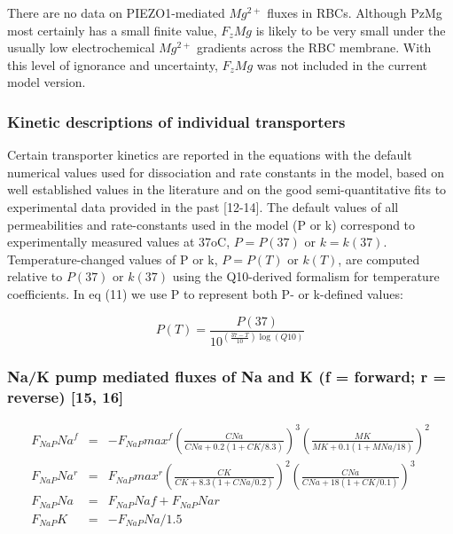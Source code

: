 \documentclass[a4paper]{article}
\newcommand{\med}[1]{M#1}
\newcommand{\cell}[1]{C#1}
\newcommand{\MNa}{\med{Na}}
\newcommand{\MK}{\med{K}}
\newcommand{\CNa}{\cell{Na}}
\newcommand{\CK}{\cell{K}}
\newcommand{\F}[2]{F_{#1}#2}
\begin{document}
There are no data on PIEZO1-mediated $Mg^{2+}$ fluxes in RBCs.  Although PzMg most certainly has a small finite value, $\F{z}{Mg}$ is likely to be very small under the usually low electrochemical $Mg^{2+}$ gradients across the RBC membrane.  With this level of ignorance and uncertainty, $\F{z}{Mg}$ was not included in the current model version.  

\subsubsection{Kinetic descriptions of individual transporters}
Certain transporter kinetics are reported in the equations with the default numerical values used for dissociation and rate constants in the model, based on well established values in the literature and on the good semi-quantitative fits to experimental data provided in the past [12-14].  The default values of all permeabilities and rate-constants used in the model (P or k) correspond to experimentally measured values at 37oC, $P = P(37)$ or $k = k(37)$.  Temperature-changed values of P or k, $P = P(T)$ or $k(T)$, are computed relative to $P(37)$ or $k(37)$ using the Q10-derived formalism for temperature coefficients. In eq (11) we use P to represent both P- or k-defined values:

\setcounter{equation}{10}
\renewcommand{\theequation}{\arabic{equation}}
\begin{equation}
P(T)  =  \frac{P(37)}{10^{\left(\frac{37-T}{10}\right)\log(Q10)}}
\end{equation}
\setcounter{equation}{0}
\renewcommand{\theequation}{11.\alph{equation}}


\subsubsection{Na/K pump mediated fluxes of Na and K (f = forward; r = reverse) [15, 16]}

\begin{eqnarray}
\F{NaP}{Na}^f  &=& -\F{NaP}{max}^f\left(\frac{\CNa}{\CNa + 0.2(1 + \CK/8.3)}\right)^3 \left(\frac{\MK}{\MK + 0.1(1 + \MNa/18)}\right)^2 \\
\F{NaP}{Na}^r  &=& \F{NaP}{max}^r\left(\frac{\CK}{\CK + 8.3(1 + \CNa/0.2)}\right)^2\left(\frac{\CNa}{\CNa + 18(1 + \CK/0.1)}\right)^3 \\
\F{NaP}{Na} &=& \F{NaP}{Naf} + \F{NaP}{Nar} \\
\F{NaP}{K} &=& -\F{NaP}{Na}/1.5
\end{eqnarray}
\end{document}

